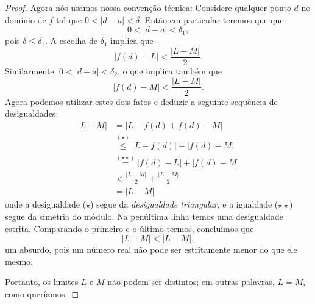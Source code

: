 \begin{proof}
	Agora nós usamos nossa convenção técnica: Considere qualquer ponto $d$ no domínio de $f$ tal que $0<|d-a|<\delta$. Então em particular teremos que que
	\[0<|d-a|<\delta_1,\]
	pois $\delta\leq\delta_1$. A escolha de $\delta_1$ implica que
	\[|f(d)-L|<\frac{|L-M|}{2}.\]
	Similarmente, $0<|d-a|<\delta_2$, o que implica também que
	\[|f(d)-M|<\frac{|L-M|}{2}.\]
	Agora podemos utilizar estes dois fatos e deduzir a seguinte sequência de desigualdades:
	\begin{align*}
	|L-M|&=|L-f(d)+f(d)-M|\\
		&\overset{(\star)}{\leq} |L-f(d)|+|f(d)-M|\\
		&\overset{(\star\star)}{=}|f(d)-L|+|f(d)-M|\\
		&<\frac{|L-M|}{2}+\frac{|L-M|}{2}\\
		&=|L-M|
	\end{align*}
	onde a desigualdade ($\star$) segue da \emph{desigualdade triangular}, e a igualdade ($\star\star$) segue da simetria do módulo. Na penúltima linha temos uma desigualdade estrita. Comparando o primeiro e o último termos, concluímos que
	\[|L-M|<|L-M|,\]
	um absurdo, pois um número real não pode ser estritamente menor do que ele mesmo.
	
	Portanto, os limites $L$ e $M$ não podem ser distintos; em outras palavras, $L=M$, como queríamos.
\end{proof}